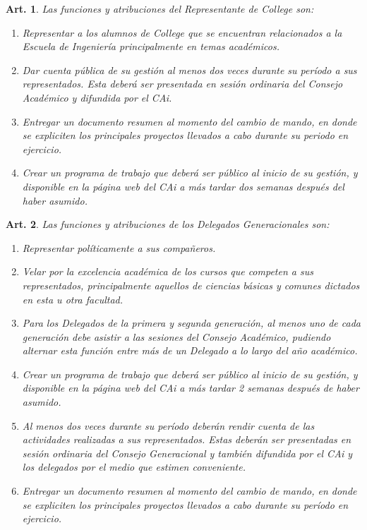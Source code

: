 \documentclass[letterpaper,11pt]{article}
\theoremstyle{plain}
\newtheorem{art}{Art.} %
\begin{document}
		\begin{art}\label{representanteCollege}
			Las funciones y atribuciones del Representante de College son:
			\begin{enumerate}
				\item Representar a los alumnos de College que se encuentran relacionados a la Escuela de Ingeniería principalmente en temas académicos.
				\item Dar cuenta pública de su gestión al menos dos veces durante su período a sus representados. Esta deberá ser presentada en sesión ordinaria del Consejo Académico y difundida por el CAi.
				\item Entregar un documento resumen al momento del cambio de mando, en donde se expliciten los principales proyectos llevados a cabo durante su periodo en ejercicio. 
				\item Crear un programa de trabajo que deberá ser público al inicio de su gestión, y disponible en la página web del CAi a más tardar dos semanas después del haber asumido.
			\end{enumerate}
		\end{art}

		\begin{art}\label{funcionesDelegadosGeneracionales}
			Las funciones y atribuciones de los Delegados Generacionales son:
			\begin{enumerate}
				\item Representar políticamente a sus compañeros.
				\item Velar por la excelencia académica de los cursos que competen a sus representados, principalmente aquellos de ciencias básicas y comunes dictados en esta u otra facultad.
				\item Para los Delegados de la primera y segunda generación, al menos uno de cada generación debe asistir a las sesiones del Consejo Académico, pudiendo alternar esta función entre más de un Delegado a lo largo del año académico.
				\item Crear un programa de trabajo que deberá ser público al inicio de su gestión, y disponible en la página web del CAi a más tardar 2 semanas después de haber asumido.
				\item \label{cuentaPublica} Al menos dos veces durante su período deberán rendir cuenta de las actividades realizadas a sus representados. Estas deberán ser presentadas en sesión ordinaria del Consejo Generacional y también difundida por el CAi  y los delegados por el medio que estimen conveniente.
				\item Entregar un documento resumen al momento del cambio de mando, en donde se expliciten los principales proyectos llevados a cabo durante su período en ejercicio.
			\end{enumerate}
		\end{art}
\end{document}
